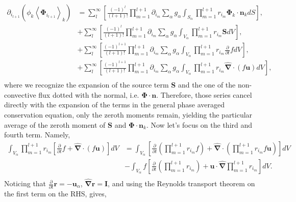 \documentclass[twocolumn]{My_article}
\newcommand{\kavg}[1]{\left<#1\right>_k}
\newcommand{\pri}[2]{ \prod_{m=#1}^{#2} r_{i_m}}
\newcommand{\nablabh}{\hat{\bm{\nabla}}}
\newcommand{\pddt}{\frac{\partial}{\partial t}}
\begin{document}
\begin{align*}
    \partial_{i_{l+1}}
    (\phi_k \kavg{\bm{\Phi}_{i_{l+1}}})
    & =\sum_l^\infty
    \left[
        \frac{(-1)^{l}}{(l+1)!}
        \prod^{l+1}_{m=1}
        \partial_{i_m}
        \sum_{\alpha}
        g_{\alpha}
        \int_{S_\alpha}
        \prod^{l+1}_{m=1}
        r_{i_m} \bm{\Phi}_k \cdot \textbf{n}_k dS
    \right],\\
    & +\sum_l^\infty
    \left[
        \frac{(-1)^{l}}{(l+1)!}
        \prod^{l+1}_{m=1}
        \partial_{i_m}
        \sum_{\alpha}
        g_{\alpha}
        \int_{V_\alpha}
        \prod^{l+1}_{m=1}
        r_{i_m} \textbf{S} dV
    \right],\\
    & +\sum_l^\infty
    \left[
        \frac{(-1)^{l+1}}{(l+1)!}
        \prod^{l+1}_{m=1}
        \partial_{i_m}
        \sum_{\alpha}
        g_{\alpha}
        \int_{V_\alpha}
        \prod^{l+1}_{m=1}
        r_{i_m} \pddt f dV
    \right],\\
    & +\sum_l^\infty
    \left[
        \frac{(-1)^{l+1}}{(l+1)!}
        \prod^{l+1}_{m=1}
        \partial_{i_m}
        \sum_{\alpha}
        g_{\alpha}
        \int_{V_\alpha}
        \prod^{l+1}_{m=1}
        r_{i_m} \nablabh \cdot (f \textbf{u}) dV
    \right],\\
\end{align*}
where we recognize the expansion of the source term \textbf{S} and the one of the non-convective flux dotted with the normal, i.e. $\bm{\Phi}\cdot\textbf{n}$.
Therefore, those series cancel directly with the expansion of the terms in the general phase averaged conservation equation, only the zeroth moments remain, yielding the particular average of the zeroth moment of \textbf{S} and $\bm{\Phi}\cdot \textbf{n}_k$.
Now let's focus on the third and fourth term. Namely,
\begin{align*}
    \int_{V_\alpha}\pri{1}{l+1}\left[
        \pddt f
        +
        \nablabh \cdot (f \textbf{u})
    \right]dV
    &= \int_{V_\alpha} \left[
    \pddt \left(\pri{1}{l+1}  f \right)
    +
    \nablabh \cdot \left(
    \prod^{l+1}_{m=1}
    r_{i_m} f \textbf{u}
    \right) \right]dV   \\
    &- \int_{V_\alpha}f\left[
        \pddt \left(\prod^{l+1}_{m=1}
        r_{i_m} \right)
        +
        \textbf{u} \cdot
        \nablabh \pri{1}{l+1}
    \right]
    dV.\\
\end{align*}
Noticing that $\pddt \textbf{r} = - \textbf{u}_\alpha$, $\nablabh \textbf{r} = \textbf{I}$, and using the Reynolds transport theorem on the first term on the RHS, gives,
\end{document}
